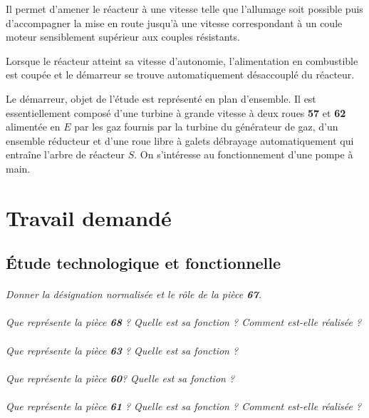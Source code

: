 \documentclass[11pt,oneside]{article}
\begin{document}
Il permet d'amener le réacteur à une vitesse telle que l'allumage soit possible puis d'accompagner la mise en route jusqu'à une vitesse correspondant à un coule moteur sensiblement supérieur aux couples résistants. 

Lorsque le réacteur atteint sa vitesse d'autonomie, l'alimentation en combustible est coupée et le démarreur se trouve automatiquement désaccouplé du réacteur. 

Le démarreur, objet de l'étude est représenté en plan d'ensemble. Il est essentiellement composé d'une turbine à grande vitesse à deux roues \textbf{57} et \textbf{62} alimentée en $E$ par les gaz fournis par la turbine du générateur de gaz, d'un ensemble réducteur et d'une roue libre à galets débrayage automatiquement qui entraîne l'arbre de réacteur $S$.
On s'intéresse au fonctionnement d'une pompe à main.


\section*{Travail demandé}

\subsection*{Étude technologique et fonctionnelle}

\paragraph{}
\textit{Donner la désignation normalisée et le rôle de la pièce \textbf{67}.}

\paragraph{}
\textit{Que représente la pièce \textbf{68} ? Quelle est sa fonction ? Comment est-elle réalisée ?}

\paragraph{}
\textit{Que représente la pièce \textbf{63} ? Quelle est sa fonction ?}

\paragraph{}
\textit{Que représente la pièce \textbf{60}? Quelle est sa fonction ?}

\paragraph{}
\textit{Que représente la pièce \textbf{61} ? Quelle est sa fonction ? Comment est-elle réalisée ?}
\end{document}
